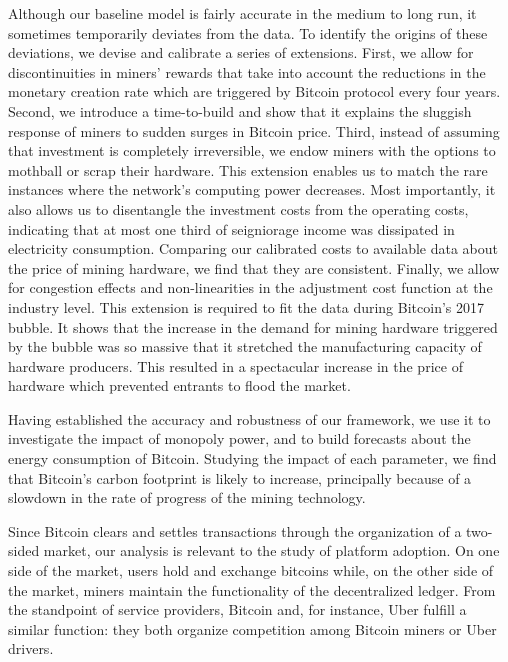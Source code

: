 \documentclass[12pt, a4paper]{article}
\begin{document}
Although our baseline model is fairly accurate in the medium to long run, it sometimes
temporarily deviates from the data. To identify
the origins of these deviations, we devise and calibrate a series of extensions.
First, we allow for discontinuities in miners' rewards that take
into account the reductions in the monetary creation rate which are triggered by Bitcoin
protocol every four years. Second, we introduce a time-to-build and show that
it explains the sluggish response of miners to sudden surges in Bitcoin price.
Third, instead of assuming that investment is
completely irreversible, we endow miners with the options to mothball or
scrap their hardware. This extension enables us to match the rare instances
where the network's computing power decreases. Most importantly, it also
allows us to disentangle the investment costs from the operating costs, indicating that
at most one third of seigniorage income was
dissipated in electricity consumption. Comparing our calibrated costs to available
data about the price of mining hardware, we find that they are consistent.
Finally, we allow for congestion effects and non-linearities in
the adjustment cost function at the industry level. This extension is required
to fit the data during Bitcoin's 2017 bubble. It shows that the increase
in the demand for mining hardware triggered by the bubble was so massive that it stretched the manufacturing capacity
of hardware producers. This resulted in a spectacular increase in the price of hardware which prevented
entrants to flood the market.

Having established the accuracy and robustness of our framework, we use it to
investigate the impact of monopoly power, and to build forecasts about
the energy consumption of Bitcoin. Studying the impact of each
parameter, we find that
Bitcoin's carbon footprint is likely to increase, principally because of a
slowdown in the rate of progress of the mining technology.

Since Bitcoin clears and settles transactions through the organization
of a two-sided market, our analysis is relevant to the study of platform adoption.
On one side of the market, users hold and exchange bitcoins while, on the other side of the market, miners
maintain the functionality of the decentralized ledger.
From the standpoint of service providers, Bitcoin
and, for instance, Uber fulfill a similar function: they both organize competition among Bitcoin miners or Uber drivers.
\end{document}
